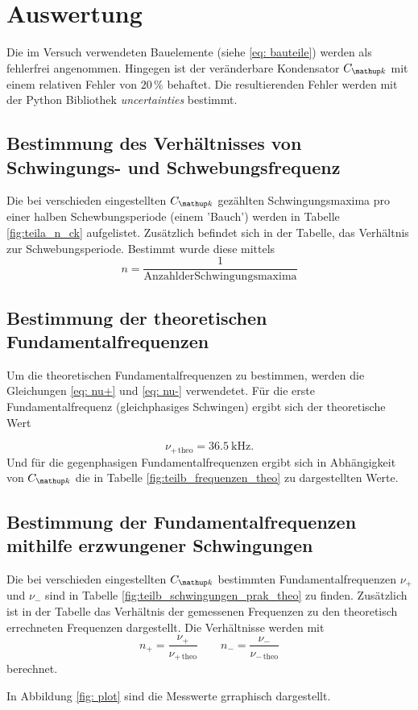 \section{Auswertung}
Die im Versuch verwendeten Bauelemente (siehe \eqref{eq: bauteile})
werden als fehlerfrei angenommen.
Hingegen ist der veränderbare Kondensator $C\ua{k}$ mit
einem relativen Fehler von $20\,\%$ behaftet.
Die resultierenden Fehler werden mit der Python Bibliothek
\emph{uncertainties} bestimmt.

\subsection{Bestimmung des Verhältnisses von Schwingungs- und Schwebungsfrequenz}
Die bei verschieden eingestellten $C\ua{k}$ gezählten Schwingungsmaxima pro einer halben %
Schewbungsperiode (einem 'Bauch') werden in Tabelle \ref{fig:teila_n_ck} aufgelistet. %
Zusätzlich befindet sich in der Tabelle, das Verhältnis zur Schwebungsperiode. %
Bestimmt wurde diese mittels %
\begin{equation*}
n=\frac{1}{\mathup{Anzahl der Schwingungsmaxima}}
\end{equation*}


\subsection{Bestimmung der theoretischen Fundamentalfrequenzen}
Um die theoretischen Fundamentalfrequenzen zu bestimmen, werden die Gleichungen \eqref{eq: nu+} und
\eqref{eq: nu-} verwendetet.
Für die erste Fundamentalfrequenz (gleichphasiges Schwingen) ergibt sich der
theoretische Wert %

\begin{equation}
\label{eq:nu_plu_theo}
\nu_{+\,\mathup{theo}}=\SI{36,5}{\kilo\hertz}.
\end{equation}
Und für die gegenphasigen Fundamentalfrequenzen ergibt sich in Abhängigkeit von $C\ua{k}$ die in Tabelle \ref{fig:teilb_frequenzen_theo} zu dargestellten Werte. %


\subsection{Bestimmung der Fundamentalfrequenzen mithilfe erzwungener Schwingungen}
Die bei verschieden eingestellten $C\ua{k}$ bestimmten Fundamentalfrequenzen
$\nu_+$ und $\nu_-$
sind in Tabelle \ref{fig:teilb_schwingungen_prak_theo} zu finden.
Zusätzlich ist in der Tabelle das Verhältnis der gemessenen Frequenzen
zu den theoretisch errechneten Frequenzen dargestellt.
Die Verhältnisse werden mit
\begin{equation}
\label{eq:verh}
n_+=\frac{\nu_+}{\nu_{+\,\mathup{theo}}} \qquad n_-=\frac{\nu_-}{\nu_{-\,\mathup{theo}}}
\end{equation}
berechnet.
\FloatBarrier

\FloatBarrier
In Abbildung \ref{fig: plot} sind die Messwerte grraphisch dargestellt. %

